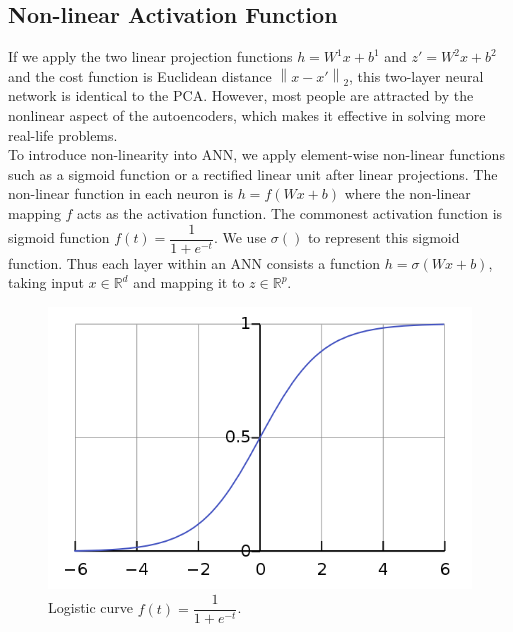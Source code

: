 \documentclass[12pt]{report} %
\newcommand{\norm}[1]{\left\lVert #1 \right\rVert}
\begin{document}
\subsection{Non-linear Activation Function}
If we apply the two linear projection functions $h=W^1x+b^1$ and $z'=W^2x+b^2$ and the cost function is Euclidean distance $\norm{x-x'}_2$, this two-layer neural network is identical to the PCA. However, most people are attracted by the nonlinear aspect of the autoencoders, which makes it effective in solving more real-life problems.\\
To introduce non-linearity into ANN, we apply element-wise non-linear functions such as a sigmoid function or a rectified linear unit after linear projections. The non-linear function in each neuron is $h= f(Wx + b)$ where the non-linear mapping $f$ acts as the activation function. The commonest activation function is sigmoid function $f(t)=\dfrac{1}{1+e^{-t}}$. We use $\sigma()$ to represent this sigmoid function. Thus each layer within an ANN consists a function \(h=\sigma(Wx+b)\), taking input \(x\in \mathbb{R}^{d}\) and mapping it to \(z\in \mathbb{R}^{p}\).
\begin{figure}[H]
	\centering
	\includegraphics[scale=0.4]{pictures/sigmoid.png}
	\caption{Logistic curve $f(t)=\dfrac{1}{1+e^{-t}}$\cite{SIGPIC}.}
	\label{fig:2}
\end{figure}
\end{document}
